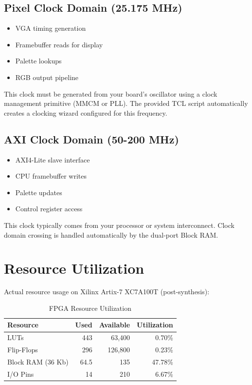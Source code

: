 \documentclass[11pt,letterpaper]{report}
\begin{document}
\subsection{Pixel Clock Domain (25.175 MHz)}

\begin{itemize}
    \item VGA timing generation
    \item Framebuffer reads for display
    \item Palette lookups
    \item RGB output pipeline
\end{itemize}

This clock must be generated from your board's oscillator using a clock management primitive (MMCM or PLL). The provided TCL script automatically creates a clocking wizard configured for this frequency.

\subsection{AXI Clock Domain (50-200 MHz)}

\begin{itemize}
    \item AXI4-Lite slave interface
    \item CPU framebuffer writes
    \item Palette updates
    \item Control register access
\end{itemize}

This clock typically comes from your processor or system interconnect. Clock domain crossing is handled automatically by the dual-port Block RAM.

\section{Resource Utilization}

Actual resource usage on Xilinx Artix-7 XC7A100T (post-synthesis):

\begin{table}[tbp]
\centering
\caption{FPGA Resource Utilization}
\label{tab:resources}
\begin{tabular}{lrrr}
\toprule
\textbf{Resource} & \textbf{Used} & \textbf{Available} & \textbf{Utilization} \\
\midrule
LUTs & 443 & 63,400 & 0.70\% \\
Flip-Flops & 296 & 126,800 & 0.23\% \\
Block RAM (36 Kb) & 64.5 & 135 & 47.78\% \\
I/O Pins & 14 & 210 & 6.67\% \\
\bottomrule
\end{tabular}
\end{table}
\end{document}
